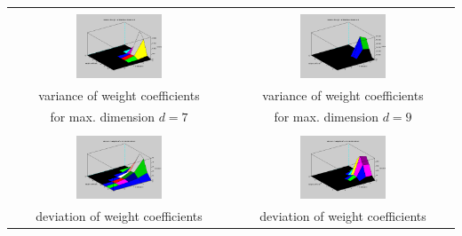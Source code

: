\documentclass[]{report}
\begin{document}
\begin{table}[h]
\begin{tabular}{| c | c|}
\hline
& \\
\includegraphics[width=0.4\textwidth]{./images/VarianceWeightCoeffinientsOverDimension_stable.png} & \includegraphics[width=0.4\textwidth]{./images/VarianceWeightCoeffinientsOverDimension.png} \\
variance of weight coefficients & variance of weight coefficients \\
for max. dimension $d=7$ & for max. dimension $d=9$ \\
\hline
\\
\includegraphics[width=0.4\textwidth]{./images/DeviationWeightCoeffinientsOverDimension_stable.png} & \includegraphics[width=0.4\textwidth]{./images/DeviationWeightCoeffinientsOverDimension.png} \\
deviation of weight coefficients & deviation of weight coefficients \\

\end{tabular}
\end{table}
\end{document}
